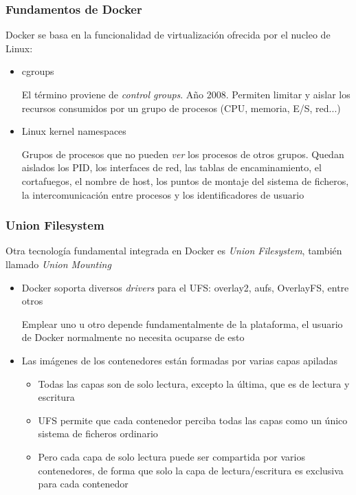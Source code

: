 \documentclass[ucs]{beamer}
\begin{document}
\begin{frame}[fragile]
\frametitle{Fundamentos de Docker}
Docker se basa en la funcionalidad de virtualización ofrecida por el nucleo de Linux:

\begin{itemize}
\item
cgroups

El término proviene de \emph{control groups}. Año 2008. Permiten limitar y aislar los recursos
consumidos por un grupo de procesos (CPU, memoria, E/S, red...)

\item
Linux kernel namespaces

Grupos de procesos que no pueden \emph{ver} los procesos de otros grupos. Quedan aislados los
PID, los interfaces de red, las tablas de encaminamiento, el cortafuegos, el nombre de host,
los puntos de montaje del sistema de ficheros, la intercomunicación entre procesos y los
identificadores de usuario

\end{itemize}

\end{frame}



\begin{frame}[fragile]
\frametitle{Union Filesystem}
Otra tecnología fundamental integrada en Docker es \emph{Union Filesystem},
también llamado \emph{Union Mounting}
\begin{itemize}
\item
Docker soporta diversos \emph{drivers} para el UFS: overlay2, aufs, OverlayFS, entre otros

Emplear uno u otro depende fundamentalmente de la plataforma, el usuario de Docker
normalmente no necesita ocuparse de esto

\item
Las imágenes de los contenedores están formadas por varias capas apiladas

\begin{itemize}
\item
Todas las capas son de solo lectura, excepto la última, que es de lectura y escritura

\item
UFS permite que cada contenedor perciba todas las capas como un único sistema de ficheros
ordinario

\item
Pero cada capa de solo lectura puede ser compartida por varios contenedores, de forma
que solo la capa de lectura/escritura es exclusiva para cada contenedor


\end{itemize}


\end{itemize}

\end{frame}
\end{document}
